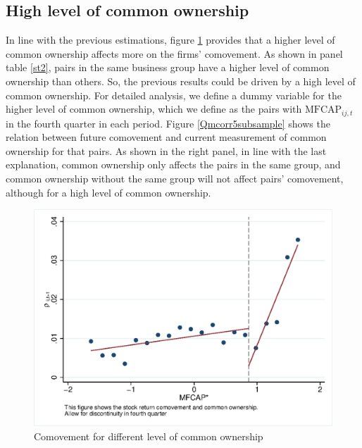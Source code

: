 		
		
		
		
		\subsection{{High level of common ownership}}
		
In line with the previous estimations, figure \ref{Qmcorr5lrd} provides that a higher level of common ownership affects more on the firms' comovement. As shown in panel   table \ref{st2}, pairs in the same business group have a higher level of common ownership than others. So, the previous results could be driven by a high level of common ownership. For detailed analysis, we define a dummy variable for the higher level of common ownership, which we define as the pairs with $\text{MFCAP}_{ij,t}$ in the fourth quarter in each period. Figure \ref{Qmcorr5subsample} shows the relation between future comovement and current measurement of common ownership for that pairs. As shown in the right panel, in line with the last explanation, common ownership only affects the pairs in the same group, and common ownership without the same group will not affect pairs' comovement, although for a high level of common ownership.
			
			
			\begin{figure}[htbp]
				\centering  
				\includegraphics[width=0.65\linewidth]{"Output/Qmcorr5lrd.eps"}
				\caption{ Comovement for different level of common ownership}
				\label{Qmcorr5lrd}
			\end{figure}
			
